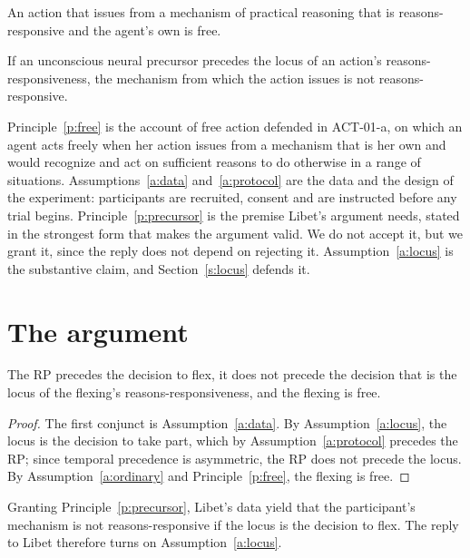 \documentclass{situationist-preprint}
\begin{document}
\begin{principle}\label{p:free}
An action that issues from a mechanism of practical reasoning that is reasons-responsive and the agent's own is free.
\end{principle}

\begin{principle}[Precursor]\label{p:precursor}
If an unconscious neural precursor precedes the locus of an action's reasons-responsiveness, the mechanism from which the action issues is not reasons-responsive.
\end{principle}

Principle~\ref{p:free} is the account of free action defended in ACT-01-a, on which an agent acts freely when her action issues from a mechanism that is her own and would recognize and act on sufficient reasons to do otherwise in a range of situations. Assumptions~\ref{a:data} and~\ref{a:protocol} are the data and the design of the experiment: participants are recruited, consent and are instructed before any trial begins. Principle~\ref{p:precursor} is the premise Libet's argument needs, stated in the strongest form that makes the argument valid. We do not accept it, but we grant it, since the reply does not depend on rejecting it. Assumption~\ref{a:locus} is the substantive claim, and Section~\ref{s:locus} defends it.

\section{The argument}

\begin{theorem}\label{t:main}
The RP precedes the decision to flex, it does not precede the decision that is the locus of the flexing's reasons-responsiveness, and the flexing is free.
\end{theorem}

\begin{proof}
The first conjunct is Assumption~\ref{a:data}. By Assumption~\ref{a:locus}, the locus is the decision to take part, which by Assumption~\ref{a:protocol} precedes the RP; since temporal precedence is asymmetric, the RP does not precede the locus. By Assumption~\ref{a:ordinary} and Principle~\ref{p:free}, the flexing is free.
\end{proof}

\begin{corollary}\label{c:valid}
Granting Principle~\ref{p:precursor}, Libet's data yield that the participant's mechanism is not reasons-responsive if the locus is the decision to flex. The reply to Libet therefore turns on Assumption~\ref{a:locus}.
\end{corollary}
\end{document}
